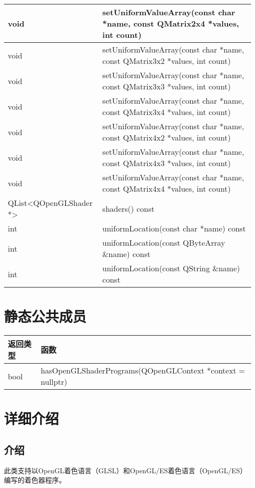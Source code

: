 \begin{longtable}[l]{|l|m{34em}|}
    \hline
    void	&setUniformValueArray(const char *name, const QMatrix2x4 *values, int count)\\
    \hline
    void&	setUniformValueArray(const char *name, const QMatrix3x2 *values, int count)\\
    \hline
    void	&setUniformValueArray(const char *name, const QMatrix3x3 *values, int count) \\ 
    \hline
    void	&setUniformValueArray(const char *name, const QMatrix3x4 *values, int count) \\ 
    \hline
    void	&setUniformValueArray(const char *name, const QMatrix4x2 *values, int count)\\ 
    \hline
    void	 &setUniformValueArray(const char *name, const QMatrix4x3 *values, int count) \\ 
    \hline
    void	& setUniformValueArray(const char *name, const QMatrix4x4 *values, int count) \\
    \hline
    QList<QOpenGLShader *>&	shaders() const \\ 
    \hline
    int	& uniformLocation(const char *name) const \\ 
    \hline
    int &	uniformLocation(const QByteArray \&name) const \\ 
    \hline
    int &	uniformLocation(const QString \&name) const \\
    \hline
    \end{longtable}

\section{静态公共成员}

\begin{tabular}[l]{|l|m{24em}|} 
    \hline
    返回类型 & 函数 \\   
    \hline
    bool &	hasOpenGLShaderPrograms(QOpenGLContext *context = nullptr) \\ 
    \hline
\end{tabular}


\section{详细介绍}

\subsection{介绍}

此类支持以OpenGL着色语言（GLSL）和OpenGL/ES着色语言（OpenGL/ES）编写的着色器程序。


